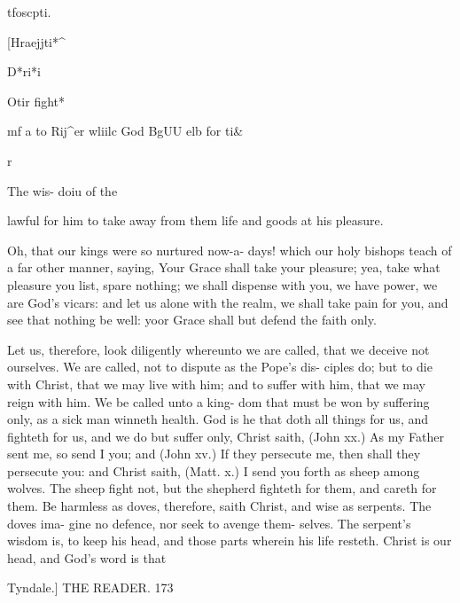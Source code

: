 \documentclass{custom}
\begin{document}
tfoscpti. 



[Hraejjti*^ 



D*ri*i 




Otir fight* 

mf a to 
Rij^er wliilc 
God BgUU 
elb for ti& 



r 



The wis- 
doiu of the 



lawful for him to take away from them life and 
goods at his pleasure.

Oh, that our kings were so nurtured now-a- 
days! which our holy bishops teach of a far 
other manner, saying, Your Grace shall take 
your pleasure; yea, take what pleasure you list, 
spare nothing; we shall dispense with you, we 
have power, we are God's vicars: and let us 
alone with the realm, we shall take pain for you, 
and see that nothing be well: yoor Grace shall 
but defend the faith only. 

Let us, therefore, look diligently whereunto 
we are called, that we deceive not ourselves. 
We are called, not to dispute as the Pope's dis- 
ciples do; but to die with Christ, that we may 
live with him; and to suffer with him, that we 
may reign with him. We be called unto a king- 
dom that must be won by suffering only, as a 
sick man winneth health. God is he that doth all 
things for us, and fighteth for us, and we do but 
suffer only, Christ saith, (John xx.) As my Father 
sent me, so send I you; and (John xv.) If they 
persecute me, then shall they persecute you:
and Christ saith, (Matt. x.) I send you forth as 
sheep among wolves. The sheep fight not, but 
the shepherd fighteth for them, and careth for 
them. Be harmless as doves, therefore, saith 
Christ, and wise as serpents. The doves ima- 
gine no defence, nor seek to avenge them- 
selves. The serpent's wisdom is, to keep his 
head, and those parts wherein his life resteth.
Christ is our head, and God's word is that 


Tyndale.] 
THE READER. 
173 
\end{document}
